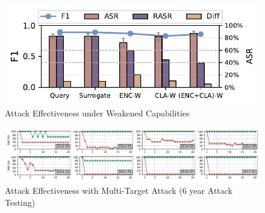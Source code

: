 \begin{figure}[h!]
	\centering
	\includegraphics[width=\linewidth,keepaspectratio]{Graph/Evaluation/Figure10_1.pdf}
	\caption{Attack Effectiveness under Weakened Capabilities}
	\label{fig:Attack-effectiveness-model-heterogeneity}
\end{figure}
\begin{figure}[t]
	\centering
	\includegraphics[width=\linewidth,keepaspectratio]{Graph/Evaluation/api_multi_attackers_fnr_1-up.pdf}
	\caption{Attack Effectiveness with Multi-Target Attack (6 year Attack Testing)}
	\label{fig: Attack Effectiveness with Multi-Target Attack}
\end{figure}

